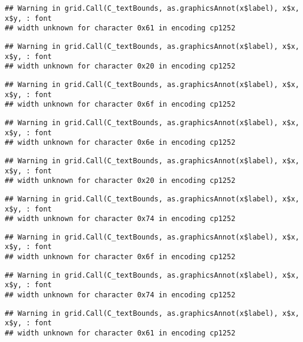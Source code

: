 \documentclass[
]{article}
\begin{document}
\begin{verbatim}
## Warning in grid.Call(C_textBounds, as.graphicsAnnot(x$label), x$x, x$y, : font
## width unknown for character 0x61 in encoding cp1252
\end{verbatim}

\begin{verbatim}
## Warning in grid.Call(C_textBounds, as.graphicsAnnot(x$label), x$x, x$y, : font
## width unknown for character 0x20 in encoding cp1252
\end{verbatim}

\begin{verbatim}
## Warning in grid.Call(C_textBounds, as.graphicsAnnot(x$label), x$x, x$y, : font
## width unknown for character 0x6f in encoding cp1252
\end{verbatim}

\begin{verbatim}
## Warning in grid.Call(C_textBounds, as.graphicsAnnot(x$label), x$x, x$y, : font
## width unknown for character 0x6e in encoding cp1252
\end{verbatim}

\begin{verbatim}
## Warning in grid.Call(C_textBounds, as.graphicsAnnot(x$label), x$x, x$y, : font
## width unknown for character 0x20 in encoding cp1252
\end{verbatim}

\begin{verbatim}
## Warning in grid.Call(C_textBounds, as.graphicsAnnot(x$label), x$x, x$y, : font
## width unknown for character 0x74 in encoding cp1252
\end{verbatim}

\begin{verbatim}
## Warning in grid.Call(C_textBounds, as.graphicsAnnot(x$label), x$x, x$y, : font
## width unknown for character 0x6f in encoding cp1252
\end{verbatim}

\begin{verbatim}
## Warning in grid.Call(C_textBounds, as.graphicsAnnot(x$label), x$x, x$y, : font
## width unknown for character 0x74 in encoding cp1252
\end{verbatim}

\begin{verbatim}
## Warning in grid.Call(C_textBounds, as.graphicsAnnot(x$label), x$x, x$y, : font
## width unknown for character 0x61 in encoding cp1252
\end{verbatim}
\end{document}

